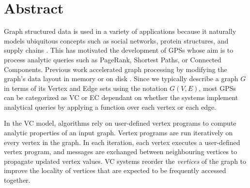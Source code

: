 
\chapter{Abstract}





\par Graph structured data is used in a variety of applications because it naturally models ubiquitous concepts such as social networks, protein structures, and supply chains \cite{heidari2018scalable, yan2011applications}. This has motivated the development of \acp{GPS} whose aim is to process analytic queries such as PageRank, Shortest Paths, or Connected Components. Previous work accelerated graph processing by modifying the graph's data layout in memory \cite{rabbit, dbg, cost} or on disk \cite{mosaic, basc}. Since we typically describe a graph $G$ in terms of its Vertex and Edge sets using the notation $G(V, E)$, most \acp{GPS} can be categorized as \ac{VC} \cite{graphchi,flashgraph, basc} or \ac{EC} \cite{xstream} dependant on whether the systems implement analytical queries by applying a function over each vertex or each edge. 

\par In the \ac{VC} model, algorithms rely on user-defined vertex programs to compute analytic properties of an input graph. Vertex programs are run iteratively on every vertex in the graph. In each iteration, each vertex executes a user-defined vertex program, and messages are exchanged between neighbouring vertices to propagate updated vertex values. \ac{VC} systems reorder the \textit{vertices} of the graph to improve the locality of vertices that are expected to be frequently accessed together. 

